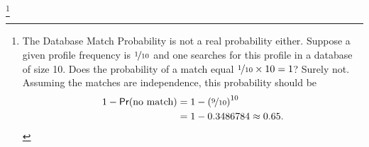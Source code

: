 \documentclass{article}
\newcommand{\pr}{\mathsf{Pr}}
\begin{document}
%
\footnote{The Database Match Probability is not a real probability either. Suppose a given profile frequency is $
\nicefrac{1}{10}$ and one searches for this profile in a database of size 10. Does the  probability of a match  equal $\nicefrac{1}{10}\times 10=1$? Surely not. Assuming the matches are independence, %
this probability should be
\begin{align*}
1-\pr(\textrm{no match}) & = 1- \left(\nicefrac{9}{10}\right)^{10}\\
& = 1- 0.3486784 \approx 0.65.
\end{align*}}

\end{document}
